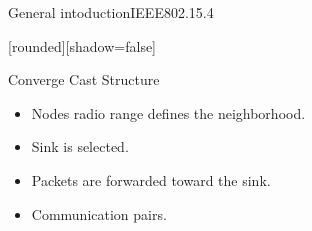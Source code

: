 \begin{withoutheadline}
\begin{frame}{General intoduction}{IEEE802.15.4}

[rounded][shadow=false]


\begin{minipage}[t]{0.48\linewidth}

\begin{block}{Converge Cast Structure}
    \begin{itemize}
    \item Nodes radio range defines the neighborhood.
    \item<2-> \alert{Sink} is selected. 
    \item<3-> Packets are forwarded \alert{toward the sink}.
    \item<4-> Communication pairs.
    \end{itemize}
    \end{block}
\end{minipage}\hfill
\begin{minipage}[t]{0.48\linewidth}
\centering
 \begin{figure}[p]


\end{figure}
\end{minipage}
\end{frame}
\end{withoutheadline}
